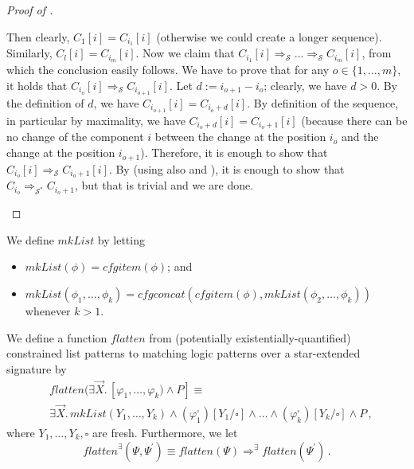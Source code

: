 \begin{proof}[Proof of ]
\begin{itemize}
          Then clearly, $C_1[i] = C_{i_1}[i]$ (otherwise we could create a longer sequence).
          Similarly, $C_l[i] = C_{i_m}[i]$.
          Now we claim that $C_{i_1}[i] \Rightarrow_{\mathcal{S}} \ldots \Rightarrow_{\mathcal{S}} C_{i_m}[i]$,
          from which the conclusion easily follows.
          We have to prove that for any $o \in \{ 1, \ldots, m \}$, it holds that
          $C_{i_o}[i] \Rightarrow_{\mathcal{S}} C_{i_{o+1}}[i]$.
          Let $d := i_{o+1} - i_{o}$; clearly, we have $d > 0$.
          By the definition of $d$, we have $C_{i_{o+1}}[i] = C_{i_{o} + d}[i]$.
          By definition of the sequence, in particular by maximality, we have $C_{i_{o} + d}[i] = C_{i_{o} + 1}[i]$
          (because there can be no change of the component $i$ between the change at the position $i_o$ and the change at the position $i_{o+1}$).
          Therefore, it is enough to show that
          $C_{i_o}[i] \Rightarrow_{\mathcal{S}} C_{i_{o}+1}[i]$.
          By  (using also  and ), it is enough to show that
          $C_{i_{o}} \Rightarrow_{\mathcal{S}^*} C_{i_{o}+1}$, but that is trivial and we are done.
\end{itemize}
\end{proof}

\begin{definition}\label{def:mkList}
We define $\mathit{mkList}$ by letting
\begin{itemize}
    \item $\mathit{mkList}(\phi) = \mathit{cfgitem}(\phi)$; and
    \item $\mathit{mkList}(\phi_1, \ldots, \phi_k) = \mathit{cfgconcat}(\mathit{cfgitem}(\phi), \mathit{mkList}(\phi_2, \ldots, \phi_k))$ whenever $k > 1$.
\end{itemize}
\end{definition}

\begin{definition}\label{def:flatten}
    We define a function $\mathit{flatten}$ from (potentially existentially-quantified) constrained list patterns
    to matching logic patterns over a star-extended signature by
    \begin{align*}
        & \mathit{flatten}(\exists \vec{X}.\, [\varphi_1, \ldots, \varphi_k) \land P] \equiv \\
        & \exists \vec{X}.\, \mathit{mkList}(Y_1, \ldots, Y_k)
        \land (\varphi_1^\square)[Y_1/\square] \land \ldots
        \land (\varphi_k^\square)[Y_k/\square] \land P \, ,
    \end{align*}
    where $Y_1,\ldots,Y_k,\square$ are fresh.
    Furthermore, we let
    \begin{equation*}
        \mathit{flatten}^\exists(\Psi,\Psi^\prime) \equiv \mathit{flatten}(\Psi) \Rightarrow^\exists \mathit{flatten}(\Psi^\prime) \, .
    \end{equation*}
\end{definition}


